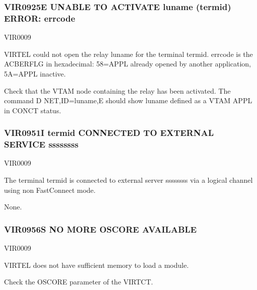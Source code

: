 \documentclass[letterpaper,10pt,english]{sphinxmanual}
\begin{document}
\subsubsection{VIR0925E UNABLE TO ACTIVATE luname (termid) ERROR: errcode}
\label{\detokenize{messages:vir0925e-unable-to-activate-luname-termid-error-errcode}}\begin{description}
\sphinxAtStartPar
VIR0009

\sphinxAtStartPar
VIRTEL could not open the relay luname for the terminal termid. errcode is the ACBERFLG in hexadecimal: 58=APPL already opened by another application, 5A=APPL inactive.

\sphinxAtStartPar
Check that the VTAM node containing the relay has been activated. The command D NET,ID=luname,E should show luname defined as a VTAM APPL in CONCT status.

\end{description}


\subsubsection{VIR0951I termid CONNECTED TO EXTERNAL SERVICE ssssssss}
\label{\detokenize{messages:vir0951i-termid-connected-to-external-service-ssssssss}}\begin{description}
\sphinxAtStartPar
VIR0009

\sphinxAtStartPar
The terminal termid is connected to external server ssssssss via a logical channel using non Fast\sphinxhyphen{}Connect mode.

\sphinxAtStartPar
None.

\end{description}


\subsubsection{VIR0956S NO MORE OSCORE AVAILABLE}
\label{\detokenize{messages:vir0956s-no-more-oscore-available}}\begin{description}
\sphinxAtStartPar
VIR0009

\sphinxAtStartPar
VIRTEL does not have sufficient memory to load a module.

\sphinxAtStartPar
Check the OSCORE parameter of the VIRTCT.

\end{description}
\end{document}
